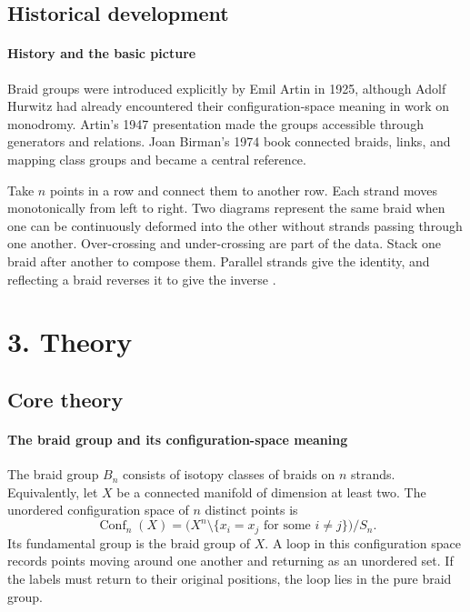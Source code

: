 \subsection*{Historical development}
\begin{historylist}
\paragraph{History and the basic picture}

Braid groups were introduced explicitly by Emil Artin in 1925, although Adolf Hurwitz had already encountered their configuration-space meaning in work on monodromy. Artin's 1947 presentation made the groups accessible through generators and relations. Joan Birman's 1974 book connected braids, links, and mapping class groups and became a central reference.

Take $n$ points in a row and connect them to another row. Each strand moves monotonically from left to right. Two diagrams represent the same braid when one can be continuously deformed into the other without strands passing through one another. Over-crossing and under-crossing are part of the data. Stack one braid after another to compose them. Parallel strands give the identity, and reflecting a braid reverses it to give the inverse \cite{braid_theory_ref1,braid_theory_ref4}.

\end{historylist}
\section*{3. Theory}
\subsection*{Core theory}
\paragraph{The braid group and its configuration-space meaning}

The braid group $B_n$ consists of isotopy classes of braids on $n$ strands. Equivalently, let $X$ be a connected manifold of dimension at least two. The unordered configuration space of $n$ distinct points is
\[
 \operatorname{Conf}_n(X)=
 \bigl(X^n\setminus\{x_i=x_j\text{ for some }i\ne j\}\bigr)/S_n.
\]
Its fundamental group is the braid group of $X$. A loop in this configuration space records points moving around one another and returning as an unordered set. If the labels must return to their original positions, the loop lies in the pure braid group.

